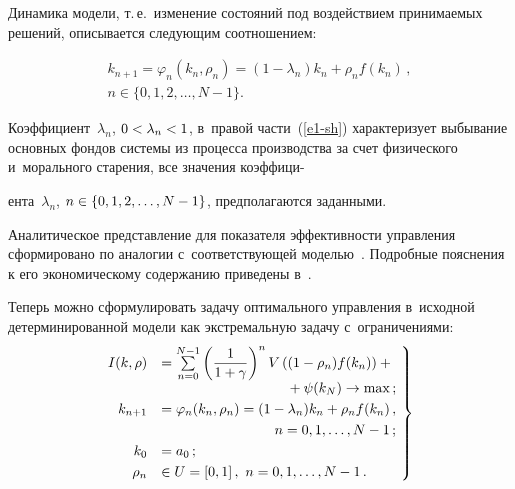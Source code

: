\begin{multicols}{2}
{}
     
     Динамика модели, т.\,е.\ изменение состояний под воздействием 
принимаемых решений, описывается сле\-ду\-ющим соотношением:

\vspace*{-6pt}

\noindent
     \begin{multline}
     k_{n+1}=\varphi_n(k_n, \rho_n) = (1-\lambda_n) k_n +\rho_n f(k_n)\,,\\ 
     n\in \{0,1,2,\ldots, N-1\}.
     \label{e1-sh}
     \end{multline}
     
     \vspace*{-2pt}
     
     Коэффициент~$\lambda_n$, $0\hm< \lambda_n \hm <1$, в~правой 
     части~(\ref{e1-sh}) характеризует выбывание основных фондов системы из 
процесса производства за счет физического и~морального старения, все значения 
коэффици-\linebreak\vspace*{-12pt}

\pagebreak

\noindent
ента~$\lambda_n$, $n\hm\in \{0,1,2,\ldots , N\hm-1\}$, предполагаются 
заданными.
     
     Аналитическое представление для показателя эффективности управления 
сформировано по аналогии с~соответствующей моделью~\cite{1-sh}. Подробные 
пояснения к его экономическому содержанию приведены в~\cite{8-sh}.
     
     Теперь можно сформулировать задачу оптимального управления в~исходной 
детерминированной модели как экстремальную задачу с~ограничениями:
     \begin{equation}
     \left.
     \begin{array}{rl}
          \!\!\!\!I(k,\rho)&=\sum\limits_{n=0}^{N-1} \left( \fr{1}{1+\gamma}\right)^n V\left( (1-
\rho_n)f(k_n)\right) +{}\\[3pt]
&\hspace*{31.5mm}{}+\psi(k_N)\to  \max\,;\\[3pt]
           \!\!  \!\!  k_{n+1}&= \varphi_n(k_n,\rho_n)=(1-\lambda_n)k_n +\rho_n f(k_n)\,,\\[3pt]
     &\hspace*{28.5mm}n=0,1,\ldots , N-1\,;\\[3pt]
              \!\! \!\!k_0&=a_0\,;\\[3pt]
              \!\! \!\!\rho_n&\in U =[0,1]\,,\ n=0,1,\ldots , N-1\,.
     \end{array}
\!     \right\}\!
\label{e2-sh}
     \end{equation}
     

\end{multicols}
